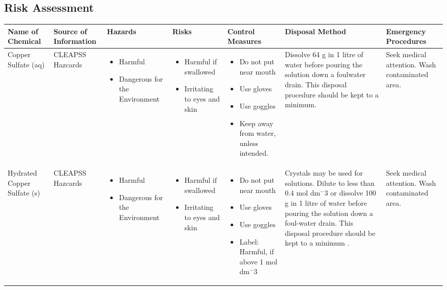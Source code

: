 \begin{landscape}

\section{Risk Assessment}

\begin{center}
\begin{longtable}{|p{1.5cm}|p{1.5cm}|p{3cm}|p{3cm}|p{3cm}|p{3cm}|p{2cm}|}
    \hline
 \textbf{Name of Chemical} & \textbf{Source of Information} & \textbf{Hazards} & \textbf{Risks} & \textbf{Control Measures} & \textbf{Disposal Method} & \textbf{Emergency Procedures} \\ \hline

Copper Sulfate (aq) &
CLEAPSS Hazcards &
\begin{itemize}
\item Harmful
\item Dangerous for the Environment \end{itemize} &
\begin{itemize}
\item Harmful if swallowed
\item Irritating to eyes and skin \end{itemize} &
\begin{itemize}
\item Do not put near mouth
\item Use gloves
\item Use goggles
\item Keep away from water, unless intended. \end{itemize} & 
Dissolve 64 g in 1 litre of water before pouring the solution down a foulwater drain. This disposal procedure should be kept to a minimum. &
Seek medical attention. Wash contaminated area. \\ \hline

Hydrated Copper Sulfate (s) &
CLEAPSS Hazcards &
\begin{itemize}
\item Harmful
\item Dangerous for the Environment \end{itemize} &
\begin{itemize}
\item Harmful if swallowed
\item Irritating to eyes and skin \end{itemize} &
\begin{itemize}
\item Do not put near mouth
\item Use gloves
\item Use goggles
\item Label: Harmful, if above 1 mol dm$^-3$ \end{itemize} &
Crystals may be used for solutions. Dilute to less than 0.4 mol dm$^-3$ or dissolve 100 g in 1 litre of water before pouring the solution down a foul-water drain. This disposal procedure should be kept to a minimum . &
Seek medical attention. Wash contaminated area. \\ \hline




\end{longtable}
\end{center}
\end{landscape}
